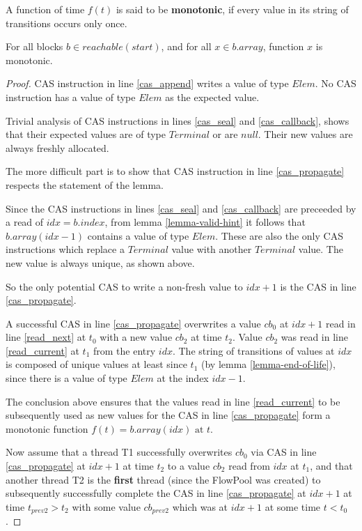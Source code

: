 \documentclass[runningheads,a4paper]{llncs}
\begin{document}
\begin{definition}[Monotonicity]
A function of time $f(t)$ is said to be \textbf{monotonic}, if every value in its string of transitions occurs only once.
\end{definition}


\begin{lemma}[Freshness]\label{lemma-freshness}
For all blocks $b \in reachable(start)$, and for all $x \in b.array$,
function $x$ is monotonic.
\end{lemma}

\begin{proof}
CAS instruction in line \ref{cas_append} writes a value of type
$Elem$. No CAS instruction has a value of type $Elem$ as the expected value.

Trivial analysis of CAS instructions in lines \ref{cas_seal} and
\ref{cas_callback}, shows that their expected values are of type
$Terminal$ or are $null$. Their new values are always freshly allocated.

The more difficult part is to show that CAS instruction in line
\ref{cas_propagate} respects the statement of the lemma.

Since the CAS instructions in lines \ref{cas_seal} and
\ref{cas_callback} are preceeded by a read of $idx = b.index$,
from lemma \ref{lemma-valid-hint} it follows that $b.array(idx - 1)$ 
contains a value of type $Elem$.
These are also the only CAS instructions which replace a $Terminal$
value with another $Terminal$ value. The new value is always unique, as
shown above.

So the only potential CAS to write a non-fresh value to $idx + 1$ is the CAS
in line \ref{cas_propagate}.

A successful CAS in line \ref{cas_propagate} overwrites a value $cb_0$ at $idx + 1$
read in line \ref{read_next} at $t_0$ with a new value $cb_2$ at time $t_2$. Value $cb_2$ was
read in line \ref{read_current} at $t_1$ from the entry $idx$. The
string of transitions of values at $idx$ is composed of unique values
at least since $t_1$ (by lemma \ref{lemma-end-of-life}), since there is
a value of type $Elem$ at the index $idx - 1$.

The conclusion above ensures that the values read in line \ref{read_current}
to be subsequently used as new values for the CAS in line \ref{cas_propagate}
form a monotonic function $f(t) = b.array(idx) \text{ at } t$.

Now assume that a thread T1 successfully overwrites $cb_0$
via CAS in line \ref{cas_propagate} at $idx + 1$ at time $t_2$ 
to a value $cb_2$ read from $idx$ at $t_1$, and that another thread T2 
is the \textbf{first} thread (since the FlowPool was created) to subsequently successfully
complete the CAS in line \ref{cas_propagate} at $idx + 1$ at time
$t_{prev2} > t_2$ with some value $cb_{prev2}$ which was at $idx + 1$ at some time
$t < t_0$.


\end{proof}
\end{document}
